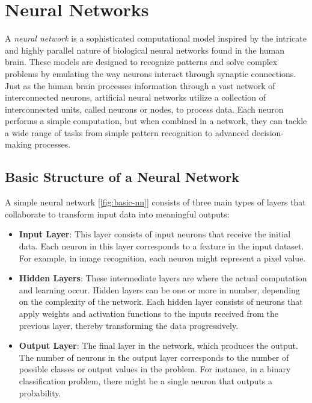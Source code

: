 \documentclass[../Thesis.tex]{subfiles}
\begin{document}
	
	\section{Neural Networks}
	\label{sec:neural_networks}
	
	A \emph{neural network} is a sophisticated computational model inspired by the intricate and highly parallel nature of biological neural networks found in the human brain. These models are designed to recognize patterns and solve complex problems by emulating the way neurons interact through synaptic connections. Just as the human brain processes information through a vast network of interconnected neurons, artificial neural networks utilize a collection of interconnected units, called neurons or nodes, to process data. Each neuron performs a simple computation, but when combined in a network, they can tackle a wide range of tasks from simple pattern recognition to advanced decision-making processes. 
	
	\subsection{Basic Structure of a Neural Network}
	
	A simple neural network [\autoref{fig:basic-nn}] consists of three main types of layers that collaborate to transform input data into meaningful outputs:
	
	\begin{itemize}
		\item \textbf{Input Layer}: This layer consists of input neurons that receive the initial data. Each neuron in this layer corresponds to a feature in the input dataset. For example, in image recognition, each neuron might represent a pixel value.
		\item \textbf{Hidden Layers}: These intermediate layers are where the actual computation and learning occur. Hidden layers can be one or more in number, depending on the complexity of the network. Each hidden layer consists of neurons that apply weights and activation functions to the inputs received from the previous layer, thereby transforming the data progressively.
		\item \textbf{Output Layer}: The final layer in the network, which produces the output. The number of neurons in the output layer corresponds to the number of possible classes or output values in the problem. For instance, in a binary classification problem, there might be a single neuron that outputs a probability.
	\end{itemize}
	
\end{document}
